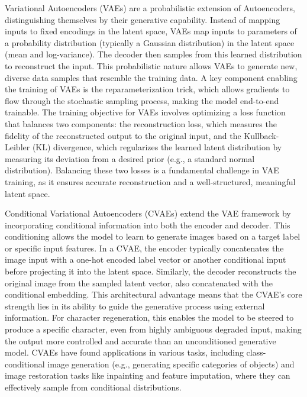 \documentclass[conference]{IEEEtran}
\begin{document}
Variational Autoencoders (VAEs) are a probabilistic extension of Autoencoders, distinguishing themselves by their generative capability. Instead of mapping inputs to fixed encodings in the latent space, VAEs map inputs to parameters of a probability distribution (typically a Gaussian distribution) in the latent space (mean and log-variance). The decoder then samples from this learned distribution to reconstruct the input. This probabilistic nature allows VAEs to generate new, diverse data samples that resemble the training data.\cite{Kumar2020} A key component enabling the training of VAEs is the reparameterization trick, which allows gradients to flow through the stochastic sampling process, making the model end-to-end trainable.\cite{Kumar2020} The training objective for VAEs involves optimizing a loss function that balances two components: the reconstruction loss, which measures the fidelity of the reconstructed output to the original input, and the Kullback-Leibler (KL) divergence, which regularizes the learned latent distribution by measuring its deviation from a desired prior (e.g., a standard normal distribution). Balancing these two losses is a fundamental challenge in VAE training, as it ensures accurate reconstruction and a well-structured, meaningful latent space.\cite{Kumar2020}


Conditional Variational Autoencoders (CVAEs) extend the VAE framework by incorporating conditional information into both the encoder and decoder. This conditioning allows the model to learn to generate images based on a target label or specific input features.\cite{Kumar2020, Graves2013} In a CVAE, the encoder typically concatenates the image input with a one-hot encoded label vector or another conditional input before projecting it into the latent space. Similarly, the decoder reconstructs the original image from the sampled latent vector, also concatenated with the conditional embedding.\cite{Kumar2020, Graves2013} This architectural advantage means that the CVAE's core strength lies in its ability to guide the generative process using external information. For character regeneration, this enables the model to be steered to produce a specific character, even from highly ambiguous degraded input, making the output more controlled and accurate than an unconditioned generative model.\cite{Kumar2020, Emuru2023} CVAEs have found applications in various tasks, including class-conditional image generation (e.g., generating specific categories of objects) and image restoration tasks like inpainting and feature imputation, where they can effectively sample from conditional distributions.
\end{document}
